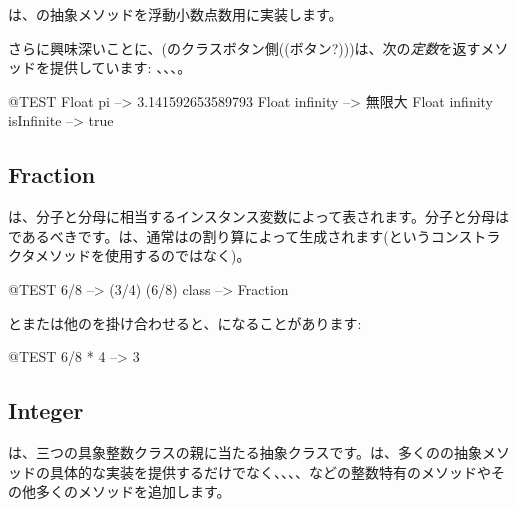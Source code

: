\documentclass[a4paper,10pt,twoside]{book}
\begin{document}
は、の抽象メソッドを浮動小数点数用に実装します。

さらに興味深いことに、(\ie{}のクラスボタン側((ボタン?)))は、次の\emph{定数}を返すメソッドを提供しています: 、、、。

\begin{code}{@TEST}
Float pi                      --> 3.141592653589793
Float infinity               --> 無限大
Float infinity isInfinite --> true
\end{code}

\subsection{Fraction}

は、分子と分母に相当するインスタンス変数によって表されます。分子と分母はであるべきです。は、通常はの割り算によって生成されます(というコンストラクタメソッドを使用するのではなく)。

\begin{code}{@TEST}
6/8             --> (3/4)
(6/8) class --> Fraction
\end{code}

とまたは他のを掛け合わせると、になることがあります:

\begin{code}{@TEST}
6/8 * 4 --> 3
\end{code}


\subsection{Integer}

は、三つの具象整数クラスの親に当たる抽象クラスです。は、多くのの抽象メソッドの具体的な実装を提供するだけでなく、、、、などの整数特有のメソッドやその他多くのメソッドを追加します。
\end{document}
